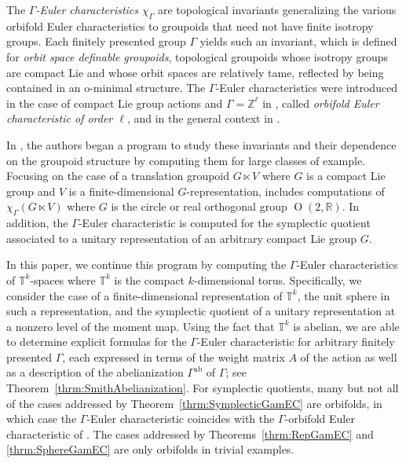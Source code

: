 \documentclass[twoside]{amsart}
\theoremstyle{definition}
\theoremstyle{remark}
\numberwithin{equation}{section}
\newcommand{\R}{\mathbb{R}}
\newcommand{\T}{\mathbb{T}}
\newcommand{\Z}{\mathbb{Z}}
\newcommand{\ab}{\text{ab}}
\newcommand{\OO}{\operatorname{O}}
\begin{document}
The \emph{$\Gamma$-Euler characteristics} $\chi_\Gamma$ are topological invariants generalizing the various orbifold Euler characteristics
\cite{AtiyahSegal,DixonHarveyEA,FarsiSeaGenOrbEuler,HirzebruchHoefer,Roan,TamanoiMorava,TamanoiCovering} to groupoids that need not have finite isotropy groups.
Each finitely presented group $\Gamma$ yields such an invariant, which is defined for \emph{orbit space definable groupoids}, topological groupoids whose
isotropy groups are compact Lie and whose orbit spaces are relatively tame, reflected by being contained in an o-minimal structure.
The $\Gamma$-Euler characteristics were introduced in the case of compact Lie group actions and $\Gamma = \Z^\ell$ in \cite{G-ZLM-Hcompact},
called \emph{orbifold Euler characteristic of order $\ell$}, and in the general context in \cite{FarSeaJLMS}.

In \cite{FarsiMeitSeaton}, the authors began a program to study these invariants and their dependence on the groupoid structure
by computing them for large classes of example. Focusing on the case of a translation groupoid $G\ltimes V$ where $G$ is a compact Lie group
and $V$ is a finite-dimensional $G$-representation, \cite{FarsiMeitSeaton} includes computations of $\chi_\Gamma(G\ltimes V)$ where $G$ is the circle or real
orthogonal group $\OO(2, \R)$. In addition, the $\Gamma$-Euler characteristic is computed for the symplectic quotient associated to a unitary representation
of an arbitrary compact Lie group $G$.

In this paper, we continue this program by computing the $\Gamma$-Euler characteristics of $\T^k$-spaces where $\T^k$ is the compact $k$-dimensional torus.
Specifically, we consider the case of a finite-dimensional representation of $\T^k$, the unit sphere in such a representation, and the symplectic quotient
of a unitary representation at a nonzero level of the moment map. Using the fact that $\T^k$ is abelian, we are able to determine explicit formulas
for the $\Gamma$-Euler characteristic for arbitrary finitely presented $\Gamma$, each expressed in terms of the weight matrix $A$ of the action as
well as a description of the abelianization $\Gamma^{\ab}$ of $\Gamma$; see Theorem~\ref{thrm:SmithAbelianization}.
For symplectic quotients, many but not all of the cases addressed by Theorem~\ref{thrm:SymplecticGamEC} are orbifolds,
in which case the $\Gamma$-Euler characteristic coincides with the $\Gamma$-orbifold Euler characteristic of
\cite{FarsiSeaGenOrbEuler,TamanoiMorava,TamanoiCovering}. The cases addressed by Theorems~\ref{thrm:RepGamEC} and \ref{thrm:SphereGamEC} are
only orbifolds in trivial examples.
\end{document}
